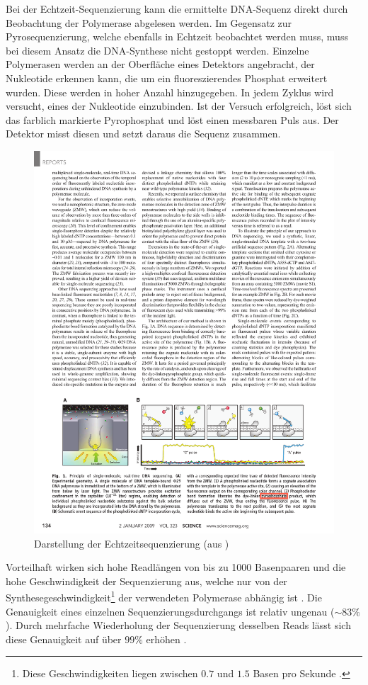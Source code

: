 Bei der Echtzeit-Sequenzierung kann die ermittelte DNA-Sequenz direkt durch Beobachtung der Polymerase abgelesen werden. Im Gegensatz zur Pyrosequenzierung, welche ebenfalls in Echtzeit beobachtet werden muss, muss bei diesem Ansatz die DNA-Synthese nicht gestoppt werden. Einzelne Polymerasen werden an der Oberfläche eines Detektors angebracht, der Nukleotide erkennen kann, die um ein fluoreszierendes Phosphat erweitert wurden\citep{Eid2009}. Diese werden in hoher Anzahl hinzugegeben. In jedem Zyklus wird versucht, eines der Nukleotide einzubinden. Ist der Versuch erfolgreich, löst sich das farblich markierte Pyrophosphat und löst einen messbaren Puls aus. Der Detektor misst diesen und setzt daraus die Sequenz zusammen.
\begin{figure}[H]
	\begin{center}
		\includegraphics[width=\textwidth]{bilder/Sequenzierung_Realtime}
	\end{center}
	\caption{Darstellung der Echtzeitsequenzierung (aus \citet{Eid2009})}
	\label{fig:bio:seq:realtime}
\end{figure}
	Vorteilhaft wirken sich hohe Readlängen von bis zu 1000 Basenpaaren und die hohe Geschwindigkeit der Sequenzierung aus, welche nur von der Synthesegeschwindigkeit\footnote{Diese Geschwindigkeiten liegen zwischen $0.7$ und $1.5$ Basen pro Sekunde \citep{Eid2009}.} der verwendeten Polymerase abhängig ist \citep{Metzker2010}. Die Genauigkeit eines einzelnen Sequenzierungsdurchgangs ist relativ ungenau ($\sim 83\%$). Durch mehrfache Wiederholung der Sequenzierung desselben Reads lässt sich diese Genauigkeit auf über $99\%$ erhöhen \citep{Eid2009}.
